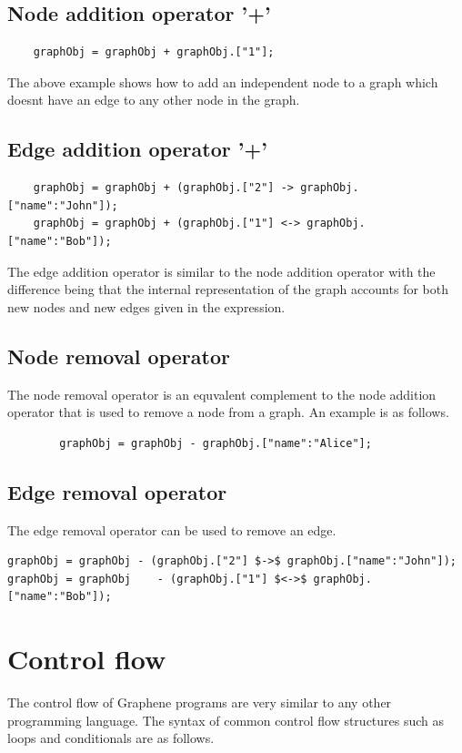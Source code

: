 \documentclass[a4paper]{article}
\begin{document}
\subsection{Node addition operator '+'}
\begin{verbatim}
    graphObj = graphObj + graphObj.["1"];
\end{verbatim}
     
\noindent The above example shows how to add an independent node to a graph which doesnt have an edge to any other node in the graph. 

\subsection{Edge addition operator '+'}
\begin{verbatim}
	graphObj = graphObj + (graphObj.["2"] -> graphObj.["name":"John"]); 
	graphObj = graphObj + (graphObj.["1"] <-> graphObj.["name":"Bob"]);
\end{verbatim}
 
\noindent The edge addition operator is similar to the node addition operator with the difference being that the internal representation of the graph accounts for both new nodes and new edges given in the expression.
\newline
\newline

\subsection{Node removal operator}
\noindent The node removal operator is an equvalent complement to the node addition operator that is used to remove a node from a graph. An example is as follows.
\begin{verbatim}
		graphObj = graphObj - graphObj.["name":"Alice"];
\end{verbatim}

\subsection{Edge removal operator}
The edge removal operator can be used to remove an edge.
\begin{verbatim}
graphObj = graphObj - (graphObj.["2"] $->$ graphObj.["name":"John"]); 
graphObj = graphObj    - (graphObj.["1"] $<->$ graphObj.["name":"Bob"]);
\end{verbatim}


\section{Control flow}
The control flow of Graphene programs are very similar to any other programming language. The syntax of common control flow structures such as loops and conditionals are as follows.
\end{document}
